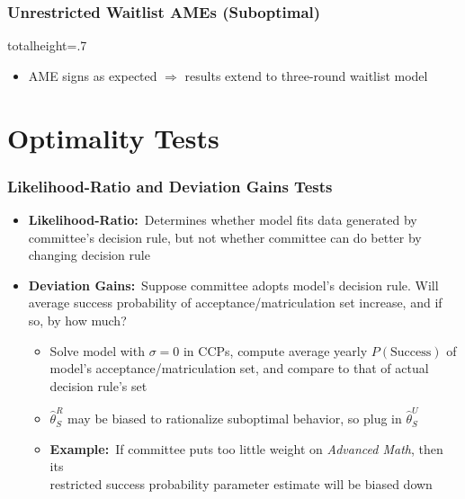 \documentclass[12pt, aspectratio=169]{beamer}
\begin{document}
\begin{frame}[label=wdues]
\frametitle{Unrestricted Waitlist AMEs (Suboptimal)}
\addtocounter{framenumber}{-1}
\begin{table}[htbp]
  \centering
  \begin{adjustbox}{totalheight=.7\textheight}

  \end{adjustbox}
\end{table}%
\begin{itemize}
\item AME signs as expected $\Rightarrow$ results extend to three-round waitlist model
\end{itemize}
\hyperlink{fwdues}{}
\hyperlink{wsss}{}
\hyperlink{whres}{}
\end{frame}


\section{Optimality Tests}
\addtocounter{framenumber}{-1}
\begin{frame}[label=lrdgt]
\frametitle{Likelihood-Ratio and Deviation Gains Tests}
\begin{itemize}
\item \textbf{Likelihood-Ratio:}\ Determines whether model fits data generated by committee's decision rule, but not whether committee can do better by changing decision rule
\vspace{10pt}
\item \textbf{Deviation Gains:}\ Suppose committee adopts model's decision rule. Will average success probability of acceptance/matriculation set increase, and if so, by how much?\!\!\!\!\!\!
\vspace{5pt}
\begin{itemize}
\item Solve model with $\sigma=0$ in CCPs, compute average yearly $P(\text{Success})$ of model's acceptance/matriculation set, and compare to that of actual decision rule's set
\vspace{5pt}
\item $\hat\theta_S^R$ may be biased to rationalize suboptimal behavior, so plug in $\hat\theta_S^U$
\vspace{5pt}
\item \textbf{Example:}\ If committee puts too little weight on \textit{Advanced Math}, then its \\ restricted success probability parameter estimate will be biased down
\vspace{10pt}
\end{itemize}
\end{itemize}
\hyperlink{otn}{}
\end{frame}
\end{document}
